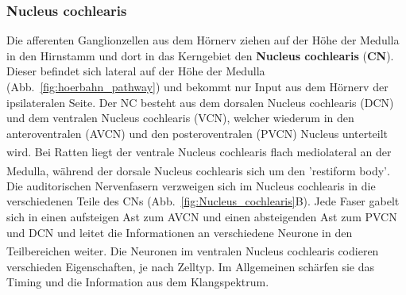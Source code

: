 \documentclass[12pt,a4paper,pdftex]{article}
\begin{document}
\subsubsection*{Nucleus cochlearis}

Die afferenten Ganglionzellen aus dem Hörnerv ziehen auf der Höhe der Medulla in den Hirnstamm und dort in das Kerngebiet den \textbf{Nucleus cochlearis} (\textbf{CN}). Dieser befindet sich  lateral auf der Höhe der Medulla (Abb.~\ref{fig:hoerbahn_pathway}) und bekommt nur Input aus dem Hörnerv der ipsilateralen Seite. Der NC besteht aus dem dorsalen Nucleus cochlearis (DCN) und dem ventralen Nucleus cochlearis (VCN), welcher wiederum in den anteroventralen (AVCN) und den posteroventralen (PVCN) Nucleus unterteilt wird\textsuperscript{\cite[29]{paxinos2014rat}}. Bei Ratten liegt der ventrale Nucleus cochlearis flach mediolateral an der Medulla, während der dorsale Nucleus cochlearis sich um den 'restiform body'\textsuperscript{\cite[29]{paxinos2014rat}}.
\\ \noindent Die auditorischen Nervenfasern verzweigen sich im Nucleus cochlearis in die verschiedenen Teile des CNs (Abb.~\ref{fig:Nucleus_cochlearis}B). Jede Faser gabelt sich in einen aufsteigen Ast zum AVCN und einen absteigenden Ast zum PVCN und DCN und leitet die Informationen an verschiedene Neurone in den Teilbereichen weiter\textsuperscript{\cite[29]{paxinos2014rat}}. Die Neuronen im ventralen Nucleus cochlearis codieren verschieden Eigenschaften, je nach Zelltyp. Im Allgemeinen schärfen sie das Timing und die Information aus dem Klangspektrum. 
\\
\end{document}

